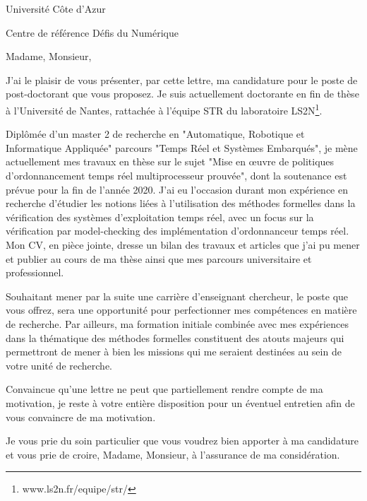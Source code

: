\documentclass[12pt]{lettre}
\begin{document}
\begin{letter}{Université Côte d'Azur
	
	Centre de référence \og Défis du Numérique \fg	
}
	
	\address{Khaoula BOUKIR\\9 rue du Fresche Blanc\\44300 Nantes}
	\nofax
	
	
	
	\def\concname{Objet :~} %
	\opening{Madame, Monsieur,}
	
	J'ai le plaisir de vous présenter, par cette lettre, ma candidature pour le poste de post-doctorant que vous proposez. Je suis actuellement doctorante en fin de thèse à l'Université de Nantes, rattachée à l'équipe STR du laboratoire LS2N\footnote{www.ls2n.fr/equipe/str/}.
	
	Diplômée d'un master 2 de recherche en "Automatique, Robotique et Informatique Appliquée" parcours "Temps Réel et Systèmes Embarqués", je mène actuellement mes travaux en thèse sur le sujet "Mise en œuvre de politiques d'ordonnancement temps réel multiprocesseur prouvée", dont la soutenance est prévue pour la fin de l'année 2020. J'ai eu l'occasion durant mon expérience en recherche d'étudier les notions liées à l'utilisation des méthodes formelles dans la vérification des systèmes d'exploitation temps réel, avec un focus sur la vérification par model-checking des implémentation d'ordonnanceur temps réel. Mon CV, en pièce jointe, dresse un bilan des travaux et articles que j'ai pu mener et publier au cours de ma thèse ainsi que mes parcours universitaire et professionnel.
	
	
	
	
	Souhaitant mener par la suite une carrière d'enseignant chercheur, le poste que vous offrez, sera une opportunité pour perfectionner mes compétences en matière de recherche. Par ailleurs, ma formation initiale combinée avec mes expériences dans la thématique des méthodes formelles constituent des atouts majeurs qui permettront de mener à bien les missions qui me seraient destinées au sein de votre unité de recherche.

	Convaincue qu’une lettre ne peut que partiellement rendre compte de ma motivation, je reste à votre
	entière disposition pour un éventuel entretien afin de vous convaincre de ma motivation.
	
	\closing{Je vous prie du soin particulier que vous voudrez bien apporter à ma candidature et vous prie de croire, Madame, Monsieur, à l’assurance de ma considération.}
	
\end{letter}
\end{document}
